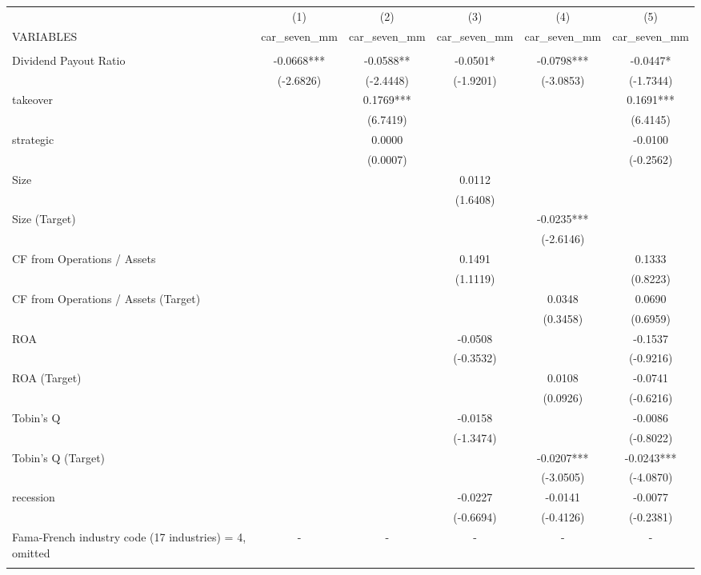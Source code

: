 \documentclass[12pt]{article}
\begin{document}
\begin{adjustbox}{max width=\textwidth}
	\begin{tabular}{lccccc} \hline
	& (1) & (2) & (3) & (4) & (5) \\
   VARIABLES & car\_seven\_mm & car\_seven\_mm & car\_seven\_mm & car\_seven\_mm & car\_seven\_mm \\ \hline
	&  &  &  &  &  \\
   Dividend Payout Ratio & -0.0668*** & -0.0588** & -0.0501* & -0.0798*** & -0.0447* \\
	& (-2.6826) & (-2.4448) & (-1.9201) & (-3.0853) & (-1.7344) \\
   takeover &  & 0.1769*** &  &  & 0.1691*** \\
	&  & (6.7419) &  &  & (6.4145) \\
   strategic &  & 0.0000 &  &  & -0.0100 \\
	&  & (0.0007) &  &  & (-0.2562) \\
   Size &  &  & 0.0112 &  &  \\
	&  &  & (1.6408) &  &  \\
   Size (Target) &  &  &  & -0.0235*** &  \\
	&  &  &  & (-2.6146) &  \\
   CF from Operations / Assets &  &  & 0.1491 &  & 0.1333 \\
	&  &  & (1.1119) &  & (0.8223) \\
   CF from Operations / Assets (Target) &  &  &  & 0.0348 & 0.0690 \\
	&  &  &  & (0.3458) & (0.6959) \\
   ROA &  &  & -0.0508 &  & -0.1537 \\
	&  &  & (-0.3532) &  & (-0.9216) \\
   ROA (Target) &  &  &  & 0.0108 & -0.0741 \\
	&  &  &  & (0.0926) & (-0.6216) \\
   Tobin's Q &  &  & -0.0158 &  & -0.0086 \\
	&  &  & (-1.3474) &  & (-0.8022) \\
   Tobin's Q (Target) &  &  &  & -0.0207*** & -0.0243*** \\
	&  &  &  & (-3.0505) & (-4.0870) \\
   recession &  &  & -0.0227 & -0.0141 & -0.0077 \\
	&  &  & (-0.6694) & (-0.4126) & (-0.2381) \\
   Fama-French industry code (17 industries) = 4, omitted & - & - & - & - & - \\
	&  &  &  &  &  \\

\end{tabular}
\end{adjustbox}
\end{document}
